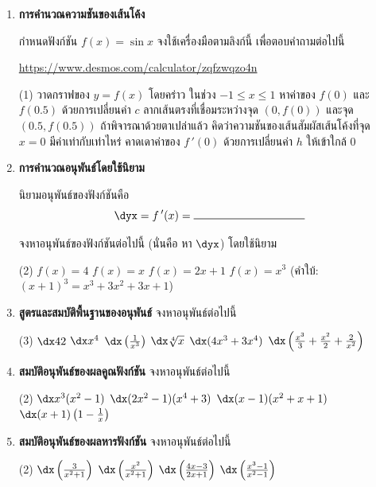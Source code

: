\begin{enumerate}
\item \textbf{การคำนวณความชันของเส้นโค้ง}

กำหนดฟังก์ชัน $f(x) = \sin x$ จงใช้เครื่องมือตามลิงก์นี้ เพื่อตอบคำถามต่อไปนี้

\begin{center}
\href{https://www.desmos.com/calculator/zqfzwqzo4n}{https://www.desmos.com/calculator/zqfzwqzo4n} 
\end{center}
\begin{tasks}(1)
\task วาดกราฟของ $y = f(x)$ โดยคร่าว ในช่วง $-1 \leq x \leq 1$ 
\task หาค่าของ $f(0)$ และ $f(0.5)$ ด้วยการเปลี่ยนค่า $c$ 
\task ลากเส้นตรงที่เชื่อมระหว่างจุด $(0, f(0))$ และจุด $(0.5, f(0.5))$ 
\task ถ้าพิจารณาด้วยตาเปล่าแล้ว คิดว่าความชันของเส้นสัมผัสเส้นโค้งที่จุด $x = 0$ มีค่าเท่ากับเท่าไหร่
\task คาดเดาค่าของ $f\,'(0)$ ด้วยการเปลี่ยนค่า $h$ ให้เข้าใกล้ 0
\end{tasks}

\vspace{100pt}

\item \textbf{การคำนวณอนุพันธ์โดยใช้นิยาม}

นิยามอนุพันธ์ของฟังก์ชันคือ
\[ \dyx = f\,'(x) = \rule{100pt}{.5pt} \]

จงหาอนุพันธ์ของฟังก์ชันต่อไปนี้ \Big(นั่นคือ หา $\dyx$\Big) โดยใช้นิยาม
\begin{tasks}[after-skip = 100pt, after-item-skip = 100pt](2)
\task $f(x) = 4$
\task $f(x) = x$
\task $f(x) = 2x+1$
\task $f(x) = x^3$ (คำใบ้: $(x+1)^3 = x^3+3x^2+3x+1$)
\end{tasks}

\newpage

\item \textbf{สูตรและสมบัติพื้นฐานของอนุพันธ์} จงหาอนุพันธ์ต่อไปนี้
\begin{tasks}[after-skip = 50pt, after-item-skip = 50pt](3)
\task $\dx 42$
\task $\dx x^4$
\task $\dx \left(\frac{1}{x^3}\right)$
\task $\dx \sqrt[4]{x}$
\task $\dx (4x^3 + 3x^4)$
\task $\dx \left( \frac{x^3}{3} + \frac{x^2}{2}+\frac{2}{x^2}\right)$
\end{tasks}

\item \textbf{สมบัติอนุพันธ์ของผลคูณฟังก์ชัน} จงหาอนุพันธ์ต่อไปนี้
\begin{tasks}[after-skip = 100pt, after-item-skip = 100pt](2)
\task $\dx x^3(x^2-1)$
\task $\dx (2x^2-1)(x^4+3)$
\task $\dx (x-1)(x^2+x+1)$
\task $\dx (x+1)\left(1-\frac{1}{x}\right)$
\end{tasks}

\item \textbf{สมบัติอนุพันธ์ของผลหารฟังก์ชัน} จงหาอนุพันธ์ต่อไปนี้
\begin{tasks}[after-skip = 100pt, after-item-skip = 100pt](2)
\task $\dx \left(\frac{3}{x^2+1}\right)$
\task $\dx \left(\frac{x^2}{x^2+1}\right)$
\task $\dx \left(\frac{4x-3}{2x+1}\right)$
\task $\dx \left(\frac{x^3-1}{x^2-1}\right)$
\end{tasks}
\end{enumerate}

